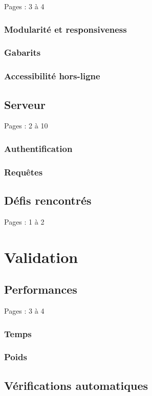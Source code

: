 \documentclass{eplmastersthesis_FR}
\begin{document}
			Pages : 3 à 4
			\subsection*{Modularité et responsiveness}
			\subsection*{Gabarits}
			\subsection*{Accessibilité hors-ligne}

		\section{Serveur}

			Pages : 2 à 10
			\subsection*{Authentification}
			\subsection*{Requêtes}

		\section{Défis rencontrés}

			Pages : 1 à 2

	\chapter{Validation}

		\section{Performances}

			Pages : 3 à 4

			\subsection*{Temps}
			\subsection*{Poids}

		\section{Vérifications automatiques}
\end{document}
